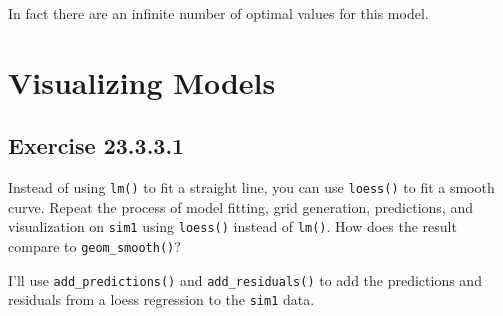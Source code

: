 \documentclass[]{book}
\newenvironment{Shaded}{\begin{snugshade}}{\end{snugshade}}
\newcommand{\CommentTok}[1]{\textcolor[rgb]{0.56,0.35,0.01}{\textit{#1}}}
\newcommand{\DataTypeTok}[1]{\textcolor[rgb]{0.13,0.29,0.53}{#1}}
\newcommand{\DecValTok}[1]{\textcolor[rgb]{0.00,0.00,0.81}{#1}}
\newcommand{\KeywordTok}[1]{\textcolor[rgb]{0.13,0.29,0.53}{\textbf{#1}}}
\newcommand{\NormalTok}[1]{#1}
\newcommand{\OperatorTok}[1]{\textcolor[rgb]{0.81,0.36,0.00}{\textbf{#1}}}
\newcommand{\StringTok}[1]{\textcolor[rgb]{0.31,0.60,0.02}{#1}}
\theoremstyle{plain}
\theoremstyle{remark}
\begin{document}
\begin{Shaded}
\end{Shaded}

\begin{Shaded}
\end{Shaded}

In fact there are an infinite number of optimal values for this model.

\hypertarget{visualizing-models}{%
\section{Visualizing Models}\label{visualizing-models}}

\hypertarget{exercise-23.3.3.1}{%
\subsection*{\texorpdfstring{Exercise {23.3.3.1}}{Exercise 23.3.3.1}}\label{exercise-23.3.3.1}}

Instead of using \texttt{lm()} to fit a straight line, you can use \texttt{loess()} to fit a smooth curve. Repeat the process of model fitting, grid generation, predictions, and visualization on \texttt{sim1} using \texttt{loess()} instead of \texttt{lm()}. How does the result compare to \texttt{geom\_smooth()}?

I'll use \texttt{add\_predictions()} and \texttt{add\_residuals()} to add the predictions and residuals from a loess regression to the \texttt{sim1} data.
\end{document}
